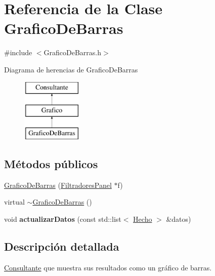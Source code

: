 \hypertarget{classGraficoDeBarras}{\section{\-Referencia de la \-Clase \-Grafico\-De\-Barras}
\label{classGraficoDeBarras}
}


{\ttfamily \#include $<$\-Grafico\-De\-Barras.\-h$>$}

\-Diagrama de herencias de \-Grafico\-De\-Barras\begin{figure}[H]
\begin{center}
\leavevmode
\includegraphics[height=3.000000cm]{classGraficoDeBarras}
\end{center}
\end{figure}
\subsection*{\-Métodos públicos}
\begin{DoxyCompactItemize}
\item 
\hyperlink{classGraficoDeBarras_add802fc700de9e32c48963f63bdbcdaf}{\-Grafico\-De\-Barras} (\hyperlink{classFiltradoresPanel}{\-Filtradores\-Panel} $\ast$f)
\item 
virtual \hyperlink{classGraficoDeBarras_aa00c42c82489d74b8dcb17e636c4a77c}{$\sim$\-Grafico\-De\-Barras} ()
\item 
\hypertarget{classGraficoDeBarras_abfeee8e37ec9ec5dab633747b9ff5b96}{void {\bfseries actualizar\-Datos} (const std\-::list$<$ \hyperlink{classHecho}{\-Hecho} $>$ \&datos)}\label{classGraficoDeBarras_abfeee8e37ec9ec5dab633747b9ff5b96}

\end{DoxyCompactItemize}


\subsection{\-Descripción detallada}
\hyperlink{classConsultante}{\-Consultante} que muestra sus resultados como un gráfico de barras. 


